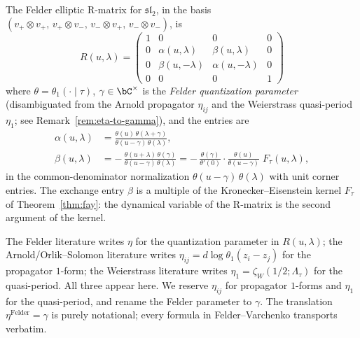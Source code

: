 \begin{definition}\label{def:elliptic-r}
The Felder elliptic R-matrix for $\mathfrak{sl}_2$, in the basis
$(v_+{\otimes}v_+,\, v_+{\otimes}v_-,\, v_-{\otimes}v_+,\,
v_-{\otimes}v_-)$, is
\[
R(u, \lambda) = \begin{pmatrix}
1 & 0 & 0 & 0 \\
0 & \alpha(u, \lambda) & \beta(u, \lambda) & 0 \\
0 & \beta(u, -\lambda) & \alpha(u, -\lambda) & 0 \\
0 & 0 & 0 & 1
\end{pmatrix}
\]
where $\theta = \theta_1(\cdot \mid \tau)$, $\gamma \in \bC^\times$ is the \emph{Felder quantization parameter} (disambiguated from the Arnold propagator $\eta_{ij}$ and the Weierstrass quasi-period $\eta_1$; see Remark~\ref{rem:eta-to-gamma}), and the entries are
\begin{align*}
\alpha(u, \lambda) &= \frac{\theta(u)\,\theta(\lambda + \gamma)}{\theta(u - \gamma)\,\theta(\lambda)}, \\
\beta(u, \lambda) &= -\,\frac{\theta(u + \lambda)\,\theta(\gamma)}{\theta(u - \gamma)\,\theta(\lambda)}
= -\,\frac{\theta(\gamma)}{\theta'(0)}\cdot\frac{\theta(u)}{\theta(u-\gamma)}\;
F_\tau(u, \lambda),
\end{align*}
in the common-denominator normalization $\theta(u-\gamma)\,\theta(\lambda)$ with unit corner entries. The exchange entry $\beta$ is a multiple of the Kronecker--Eisenstein kernel $F_\tau$ of Theorem~\ref{thm:fay}: the dynamical variable of the R-matrix is the second argument of the kernel.
\end{definition}

\begin{remark}\label{rem:eta-to-gamma}
The Felder literature writes $\eta$ for the quantization parameter in $R(u,\lambda)$; the Arnold/Orlik--Solomon literature writes $\eta_{ij} = d\log\theta_1(z_i - z_j)$ for the propagator $1$-form; the Weierstrass literature writes $\eta_1 = \zeta_W(1/2;\Lambda_\tau)$ for the quasi-period. All three appear here. We reserve $\eta_{ij}$ for propagator $1$-forms and $\eta_1$ for the quasi-period, and rename the Felder parameter to $\gamma$. The translation $\eta^{\mathrm{Felder}} = \gamma$ is purely notational; every formula in Felder--Varchenko transports verbatim.
\end{remark}



